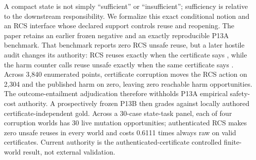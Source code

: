 \markdownRendererDocumentBegin
A compact state is not simply “sufficient” or “insufficient”; sufficiency is relative to the downstream responsibility. We formalize this exact conditional notion and an RCS interface whose declared support controls reuse and reopening. The paper retains an earlier frozen negative and an exactly reproducible P13A benchmark. That benchmark reports zero RCS unsafe reuse, but a later hostile audit changes its authority: RCS reuses exactly when the certificate says , while the harm counter calls reuse unsafe exactly when the same certificate says . Across 3,840 enumerated points, certificate corruption moves the RCS action on 2,304 and the published harm on zero, leaving zero reachable harm opportunities. The outcome-entailment adjudication therefore withholds P13A empirical safety-cost authority. A prospectively frozen P13B then grades against locally authored certificate-independent gold. Across a 30-case state-task panel, each of four corruption worlds has 30 live mutation opportunities; authenticated RCS makes zero unsafe reuses in every world and costs 0.6111 times always raw on valid certificates. Current authority is the authenticated-certificate controlled finite-world result, not external validation.\markdownRendererDocumentEnd